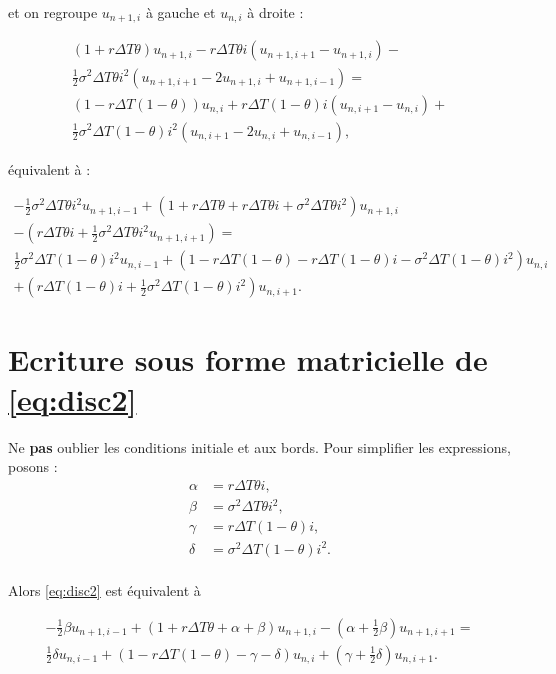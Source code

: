\documentclass[a4paper, 11pt]{article}
\renewcommand{\(}{\left (}
\renewcommand{\)}{\right )}
\newcommand{\uni}[2]{u_{{#1},{#2}}}
\begin{document}
et on regroupe $\uni{n + 1}{i}$ \`a gauche et $\uni{n}{i}$ \`a droite
:

\begin{multline}
  (1+r\Delta T\theta)\uni{n+1}{i} - r\Delta T\theta i(\uni{n+1}{i+1} -
  \uni{n+1}{i}) - \\
  \frac{1}{2}\sigma^2\Delta T\theta i^2 (\uni{n+1}{i+1} -2\uni{n+1}{i}
  + \uni{n+1}{i - 1}) = \\
  (1-r\Delta T(1-\theta))\uni{n}{i} + r\Delta T(1-\theta) i(\uni{n}{i+1} -
  \uni{n}{i}) + \\
  \frac{1}{2}\sigma^2\Delta T(1-\theta) i^2 (\uni{n}{i+1} -2\uni{n}{i}
  + \uni{n}{i - 1}),
\end{multline}

\'equivalent \`a :

\begin{multline}
  \label{eq:disc2}
  -\frac{1}{2}\sigma^2\Delta T\theta i^2\uni{n+1}{i - 1} + (1+r\Delta
  T\theta +r\Delta T\theta i + \sigma^2\Delta T\theta i^2)\uni{n+1}{i}
  \\
  - (r\Delta T\theta i + \frac{1}{2}\sigma^2\Delta T\theta
  i^2\uni{n+1}{i + 1}) = \\
  \frac{1}{2}\sigma^2\Delta T(1-\theta) i^2\uni{n}{i - 1} + (1-r\Delta
  T(1-\theta) -r\Delta T(1-\theta) i - \sigma^2\Delta T(1-\theta)
  i^2)\uni{n}{i} \\
  + (r\Delta T(1-\theta) i + \frac{1}{2}\sigma^2\Delta T(1-\theta)
  i^2)\uni{n}{i + 1}.
\end{multline}

\section{Ecriture sous forme matricielle de \eqref{eq:disc2}}

Ne \textbf{pas} oublier les conditions initiale et aux bords. Pour
simplifier les expressions, posons :
\begin{align*}
  \alpha & = r\Delta T\theta i,\\
  \beta  & = \sigma^2\Delta T\theta i^2, \\
  \gamma & = r\Delta T(1 - \theta) i,\\
  \delta & = \sigma^2\Delta T(1-\theta) i^2. \\
\end{align*}

Alors \eqref{eq:disc2} est \'equivalent \`a

\begin{multline}
  \label{eq:disc3}
  -\frac{1}{2}\beta\uni{n+1}{i - 1} + (1+r\Delta
  T\theta + \alpha + \beta)\uni{n+1}{i}
  - \(\alpha + \frac{1}{2}\beta\)\uni{n+1}{i + 1} = \\
  \frac{1}{2}\delta\uni{n}{i - 1} + (1-r\Delta
  T(1-\theta) - \gamma - \delta)\uni{n}{i}
  + \(\gamma + \frac{1}{2}\delta\)\uni{n}{i + 1}.
\end{multline}
\end{document}

